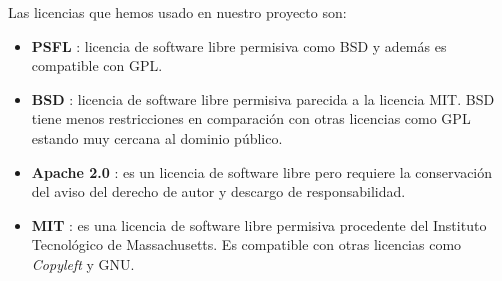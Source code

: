 Las licencias que hemos usado en nuestro proyecto son:
\begin{itemize}
\item \textbf{PSFL} \cite{wiki:psfl}: licencia de software libre permisiva como BSD y además es compatible con GPL. 
\item \textbf{BSD} \cite{wiki:bsd}: licencia de software libre permisiva parecida a la licencia MIT. BSD tiene menos restricciones en comparación con otras licencias como GPL estando muy cercana al dominio público.
\item \textbf{Apache 2.0} \cite{wiki:apache}: es un licencia de software libre pero requiere la conservación del aviso del derecho de autor y descargo de responsabilidad.
\item \textbf{MIT} \cite{wiki:mit}: es una licencia de software libre permisiva procedente del Instituto Tecnológico de Massachusetts. Es compatible con otras licencias como \textit{Copyleft} y GNU.
\end{itemize}



